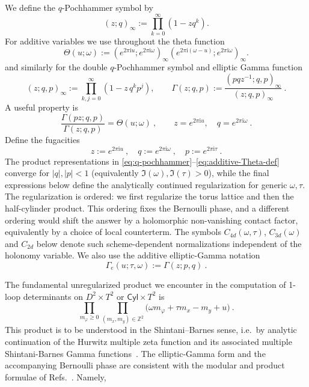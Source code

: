 \documentclass[11pt,a4paper]{article}
\numberwithin{equation}{section}
\theoremstyle{plain}
\theoremstyle{definition}
\theoremstyle{remark}
\newcommand{\ii}{\mathrm{i}}
\newcommand{\cyl}{\mathsf{Cyl}}
\begin{document}
We define the $q$-Pochhammer symbol by
\begin{equation}
(z;q)_\infty
:=
\prod_{k=0}^{\infty}(1-z q^k).
\label{eq:q-pochhammer}
\end{equation}
For additive variables we use throughout the theta function
\begin{equation}
\Theta(u;\omega):=
(e^{2\pi\ii u};e^{2\pi\ii\omega})_\infty
(e^{2\pi\ii(\omega-u)};e^{2\pi\ii\omega})_\infty .
\label{eq:additive-Theta-def}
\end{equation}
and similarly for the double $q$-Pochhammer symbol and elliptic Gamma function
\begin{equation}
(z;q,p)_\infty := \prod_{k,j=0}^\infty (1-z\,q^k p^j),
\qquad
\Gamma(z;q,p):=\frac{(pq z^{-1};q,p)_\infty}{(z;q,p)_\infty}~.
\label{eq:poch2-Gamma}
\end{equation}
A useful property is
\begin{equation}
\frac{\Gamma(p z;q,p)}{\Gamma(z;q,p)}=\Theta(u;\omega)~,\qquad z=e^{2\pi\ii u},\quad q=e^{2\pi\ii\omega}~.
\end{equation}
Define the fugacities
\begin{equation}
z:=e^{2\pi \ii u}~,\quad q := e^{2\pi \ii \omega}~,\quad p:=e^{2\pi\ii \tau}~.
\label{eq:qdef}
\end{equation}
The product representations in \eqref{eq:q-pochhammer}--\eqref{eq:additive-Theta-def} converge for $|q|,|p|<1$ (equivalently $\Im(\omega),\Im(\tau)>0$), while the final expressions below define the analytically continued regularization for generic $\omega,\tau$.  The regularization is ordered: we first regularize the torus lattice and then the half-cylinder product.  This ordering fixes the Bernoulli phase, and a different ordering would shift the answer by a holomorphic non-vanishing contact factor, equivalently by a choice of local counterterm.  The symbols \(C_{4d}(\omega,\tau)\), \(C_{3d}(\omega)\) and \(C_{2d}\) below denote such scheme-dependent normalizations independent of the holonomy variable. We also use the additive elliptic-Gamma notation
\begin{equation}
\Gamma_e(u;\tau,\omega):=\Gamma(z;p,q)~.
\label{eq:additive-notation}
\end{equation}

The fundamental unregularized product we encounter in the computation of 1-loop determinants on $D^2\times T^2$ or $\cyl\times T^2$ is 
\begin{equation}
\prod_{m_\varphi\geq 0}\prod_{(m_x,m_y)\in\mathbb{Z}^2}
\Big(\omega m_\varphi + \tau m_x-m_y+u\Big)~.
\end{equation}
This product is to be understood in the Shintani--Barnes sense, i.e.\ by analytic continuation of the Hurwitz multiple zeta function and its associated multiple Shintani-Barnes Gamma functions~\cite{Barnes1904,Shintani1976,Friedman:2004}.  The elliptic-Gamma form and the accompanying Bernoulli phase are consistent with the modular and product formulae of Refs.~\cite{Felder:1999mq,Narukawa:2003}.  Namely,
\end{document}
